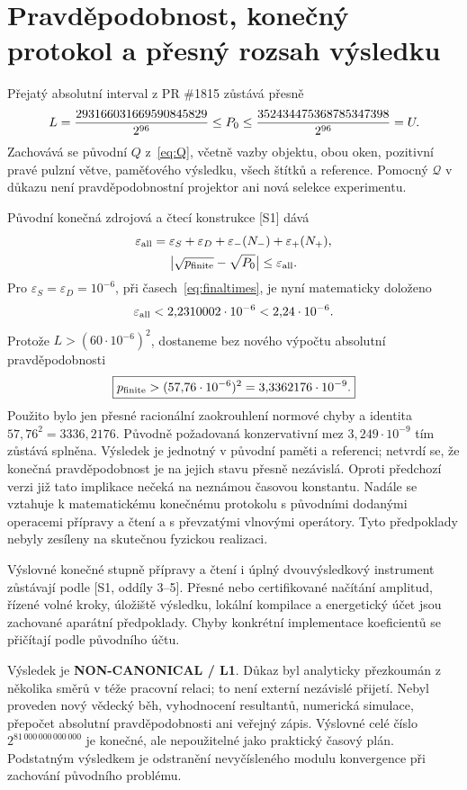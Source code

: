 \documentclass[11pt,a4paper]{article}
\newcommand{\eps}{\varepsilon}
\theoremstyle{remark}\newtheorem{remark}[theorem]{Poznámka}
\numberwithin{equation}{section}
\begin{document}
\section{Pravděpodobnost, konečný protokol a přesný rozsah výsledku}

Přejatý absolutní interval z PR \#1815 zůstává přesně
\[
L={293166031669590845829\over2^{96}}\le P_0\le
{352434475368785347398\over2^{96}}=U.
\]
Zachovává se původní \(Q\) z~\eqref{eq:Q}, včetně vazby objektu, obou oken, pozitivní pravé pulzní větve, paměťového výsledku, všech štítků a reference. Pomocný \(\mathscr Q\) v důkazu není pravděpodobnostní projektor ani nová selekce experimentu.

Původní konečná zdrojová a čtecí konstrukce [S1] dává
\begin{gather}
\eps_{\rm all}=\eps_S+\eps_D+\eps_-(N_-)+\eps_+(N_+),\notag\\
\bigl|\sqrt{p_{\rm finite}}-\sqrt{P_0}\bigr|\le\eps_{\rm all}.
\label{eq:probfinal}
\end{gather}
Pro \(\eps_S=\eps_D=10^{-6}\), při časech~\eqref{eq:finaltimes}, je nyní matematicky doloženo
\[
\eps_{\rm all}<2{,}2310002\cdot10^{-6}<2{,}24\cdot10^{-6}.
\]
Protože \(L>(60\cdot10^{-6})^2\), dostaneme bez nového výpočtu absolutní pravděpodobnosti
\begin{equation}
\boxed{p_{\rm finite}>(57{,}76\cdot10^{-6})^2
=3{,}3362176\cdot10^{-9}.}
\label{eq:prob-lower-final}
\end{equation}
Použito bylo jen přesné racionální zaokrouhlení normové chyby a identita \(57{,}76^2=3336{,}2176\). Původně požadovaná konzervativní mez \(3{,}249\cdot10^{-9}\) tím zůstává splněna. Výsledek je jednotný v původní paměti a referenci; netvrdí se, že konečná pravděpodobnost je na jejich stavu přesně nezávislá.
Oproti předchozí verzi již tato implikace nečeká na neznámou časovou konstantu. Nadále se vztahuje k matematickému konečnému protokolu s původními dodanými operacemi přípravy a čtení a s převzatými vlnovými operátory. Tyto předpoklady nebyly zesíleny na skutečnou fyzickou realizaci.

Výslovné konečné stupně přípravy a čtení i úplný dvouvýsledkový instrument zůstávají podle [S1, oddíly 3--5]. Přesné nebo certifikované načítání amplitud, řízené volné kroky, úložiště výsledku, lokální kompilace a energetický účet jsou zachované aparátní předpoklady. Chyby konkrétní implementace koeficientů se přičítají podle původního účtu.

Výsledek je \textbf{NON-CANONICAL / L1}. Důkaz byl analyticky přezkoumán z několika směrů v téže pracovní relaci; to není externí nezávislé přijetí. Nebyl proveden nový vědecký běh, vyhodnocení resultantů, numerická simulace, přepočet absolutní pravděpodobnosti ani veřejný zápis. Výslovné celé číslo \(2^{81\,000\,000\,000\,000}\) je konečné, ale nepoužitelné jako praktický časový plán. Podstatným výsledkem je odstranění nevyčísleného modulu konvergence při zachování původního problému.
\end{document}
